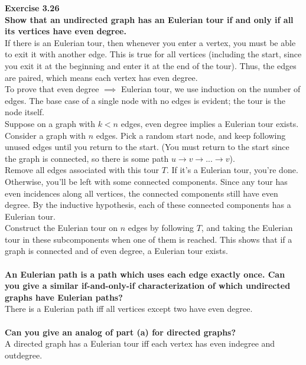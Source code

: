 \documentclass{article}
\newenvironment{problem}[2][Exercise]
    { \begin{mdframed}[backgroundcolor=gray!20] \textbf{#1 #2} \\}
    {  \end{mdframed}}
\begin{document}
\begin{problem}{3.26}
    \textbf{Show that an undirected graph has an Eulerian tour if and only if all its vertices have even degree.}
    \\
    If there is an Eulerian tour, then whenever you enter a vertex, you must be able to exit it with another edge. This is true for all vertices (including the start, since you exit it at the beginning and enter it at the end of the tour). Thus, the edges are paired, which means each vertex has even degree.
    \\
    To prove that even degree $\implies$ Eulerian tour, we use induction on the number of edges. The base case of a single node with no edges is evident; the tour is the node itself. 
    \\
    Suppose on a graph with $k < n$ edges, even degree implies a Eulerian tour exists. Consider a graph with $n$ edges. Pick a random start node, and keep following unused edges until you return to the start. (You must return to the start since the graph is connected, so there is some path $u \rightarrow v \rightarrow ... \rightarrow v$).
    \\
    Remove all edges associated with this tour $T$. If it's a Eulerian tour, you're done. Otherwise, you'll be left with some connected components. Since any tour has even incidences along all vertices, the connected components still have even degree. By the inductive hypothesis, each of these connected components has a Eulerian tour.
    \\
    Construct the Eulerian tour on $n$ edges by following $T$, and taking the Eulerian tour in these subcomponents when one of them is reached. This shows that if a graph is connected and of even degree, a Eulerian tour exists.
    \\
    \\
    \textbf{An Eulerian path is a path which uses each edge exactly once. Can you give a similar if-and-only-if characterization of which undirected graphs have Eulerian paths?}
    \\
    There is a Eulerian path iff all vertices except two have even degree.
    \\
    \\
    \textbf{Can you give an analog of part (a) for directed graphs?}
    \\
    A directed graph has a Eulerian tour iff each vertex has even indegree and outdegree.
\end{problem}
\end{document}
